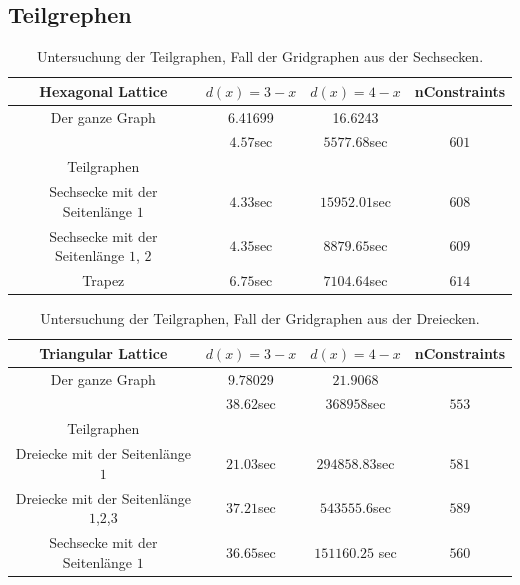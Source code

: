 \documentclass[
	fontsize=12pt,
	paper=a4,
	twoside=false,
	numbers=noenddot,
	plainheadsepline,
	toc=listof,
	toc=bibliography
]{scrartcl}
\begin{document}
\subsection{Teilgrephen}	
\begin{table}[htbp]
\centering
\begin{tabular}{|c|c|c|c|}
	\hline 
	
	Hexagonal Lattice & $d(x)=3-x$  & $d(x)=4-x$   & nConstraints \\ \hline 
	Der ganze Graph	  &  6.41699	 & 16.6243      &              \\ 
 			          &  $4.57$sec  & $5577.68$sec & $601$\\ \hline
 			          
	Teilgraphen & & &\\\hline
	Sechsecke mit der Seitenlänge $1$      & $4.33$sec & $15952.01$sec   & $608$\\ \hline
	Sechsecke mit der Seitenlänge $1$, $2$	& $4.35$sec	 & $8879.65$sec & $609$\\ \hline
	Trapez                                 & $6.75$sec & $7104.64$sec  & $614$ \\ \hline

\end{tabular}
\caption{Untersuchung der Teilgraphen, Fall der Gridgraphen aus der Sechsecken.} 
\label{Table:TG1}
\end{table}
	
\begin{table}[htbp]
\centering
\begin{tabular}{|c|c|c|c|}
		\hline 
		
		Triangular Lattice  & $d(x)=3-x$    & $d(x)=4-x$   & nConstraints \\ \hline 
		Der ganze Graph     & $9.78029$	 & $21.9068$    &              \\ 
			                & $38.62$sec    & $368958$sec  & $553$        \\ \hline
			                
		Teilgraphen & & &\\\hline
		Dreiecke mit der Seitenlänge $1$         & $21.03$sec	 & $294858.83$sec    & $581$\\ \hline
		Dreiecke mit der Seitenlänge $1$,$2$,$3$ & $37.21$sec	 & $543555.6$sec    & $589$\\ \hline
		Sechsecke mit der Seitenlänge $1$        & $36.65$sec  & $151160.25$ sec   & $560$ \\ \hline

\end{tabular}
\caption{Untersuchung der Teilgraphen, Fall der Gridgraphen aus der Dreiecken.}
\label{Table:TG2}
\end{table}
	
\end{document}
